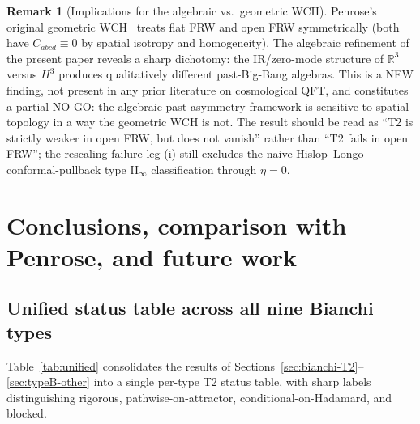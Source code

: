 \documentclass[11pt]{article}
\theoremstyle{definition}
\newtheorem{remark}[theorem]{Remark}
\newcommand{\R}{\mathbb{R}}
\begin{document}
\begin{remark}[Implications for the algebraic vs.\ geometric WCH]\label{rem:openFRW-implications}
Penrose's original geometric WCH~\cite{Penrose1979} treats flat FRW and open FRW symmetrically (both have $C_{abcd}\equiv 0$ by spatial isotropy and homogeneity). The algebraic refinement of the present paper reveals a sharp dichotomy: the IR/zero-mode structure of $\R^3$ versus $H^3$ produces qualitatively different past-Big-Bang algebras. This is a NEW finding, not present in any prior literature on cosmological QFT, and constitutes a partial NO-GO: the algebraic past-asymmetry framework is sensitive to spatial topology in a way the geometric WCH is not. The result should be read as ``T2 is strictly weaker in open FRW, but does not vanish'' rather than ``T2 fails in open FRW''; the rescaling-failure leg (i) still excludes the naive Hislop--Longo conformal-pullback type II$_\infty$ classification through $\eta=0$.
\end{remark}

\section{Conclusions, comparison with Penrose, and future work}\label{sec:conclusion}

\subsection{Unified status table across all nine Bianchi types}\label{sec:unified-table}

Table~\ref{tab:unified} consolidates the results of Sections~\ref{sec:bianchi-T2}--\ref{sec:typeB-other} into a single per-type T2 status table, with sharp labels distinguishing rigorous, pathwise-on-attractor, conditional-on-Hadamard, and blocked.
\end{document}
